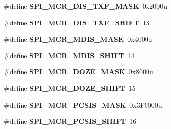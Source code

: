 \begin{DoxyCompactItemize}
\item 
\#define {\bfseries S\+P\+I\+\_\+\+M\+C\+R\+\_\+\+D\+I\+S\+\_\+\+T\+X\+F\+\_\+\+M\+A\+SK}~0x2000u\hypertarget{group__SPI__Register__Masks_gaa8bb3e6a285a70d51f3e637c2a29a41e}{}\label{group__SPI__Register__Masks_gaa8bb3e6a285a70d51f3e637c2a29a41e}

\item 
\#define {\bfseries S\+P\+I\+\_\+\+M\+C\+R\+\_\+\+D\+I\+S\+\_\+\+T\+X\+F\+\_\+\+S\+H\+I\+FT}~13\hypertarget{group__SPI__Register__Masks_ga66fb6e165076aac7d60e416ed0950067}{}\label{group__SPI__Register__Masks_ga66fb6e165076aac7d60e416ed0950067}

\item 
\#define {\bfseries S\+P\+I\+\_\+\+M\+C\+R\+\_\+\+M\+D\+I\+S\+\_\+\+M\+A\+SK}~0x4000u\hypertarget{group__SPI__Register__Masks_gad6230b186a0f86d3b06973a0abad85d3}{}\label{group__SPI__Register__Masks_gad6230b186a0f86d3b06973a0abad85d3}

\item 
\#define {\bfseries S\+P\+I\+\_\+\+M\+C\+R\+\_\+\+M\+D\+I\+S\+\_\+\+S\+H\+I\+FT}~14\hypertarget{group__SPI__Register__Masks_gad71aeecbfd5ab69825143fb055ae3e2b}{}\label{group__SPI__Register__Masks_gad71aeecbfd5ab69825143fb055ae3e2b}

\item 
\#define {\bfseries S\+P\+I\+\_\+\+M\+C\+R\+\_\+\+D\+O\+Z\+E\+\_\+\+M\+A\+SK}~0x8000u\hypertarget{group__SPI__Register__Masks_ga1f301c07deb8544d117e752400e0e537}{}\label{group__SPI__Register__Masks_ga1f301c07deb8544d117e752400e0e537}

\item 
\#define {\bfseries S\+P\+I\+\_\+\+M\+C\+R\+\_\+\+D\+O\+Z\+E\+\_\+\+S\+H\+I\+FT}~15\hypertarget{group__SPI__Register__Masks_gab24077f2090f26468c4ebe2ecfda7c5f}{}\label{group__SPI__Register__Masks_gab24077f2090f26468c4ebe2ecfda7c5f}

\item 
\#define {\bfseries S\+P\+I\+\_\+\+M\+C\+R\+\_\+\+P\+C\+S\+I\+S\+\_\+\+M\+A\+SK}~0x3\+F0000u\hypertarget{group__SPI__Register__Masks_ga69de8a51e829efc59b2a2402a8210aeb}{}\label{group__SPI__Register__Masks_ga69de8a51e829efc59b2a2402a8210aeb}

\item 
\#define {\bfseries S\+P\+I\+\_\+\+M\+C\+R\+\_\+\+P\+C\+S\+I\+S\+\_\+\+S\+H\+I\+FT}~16\hypertarget{group__SPI__Register__Masks_ga5130ba4524baa3be71b17af17b06b3e2}{}\label{group__SPI__Register__Masks_ga5130ba4524baa3be71b17af17b06b3e2}


\end{DoxyCompactItemize}
